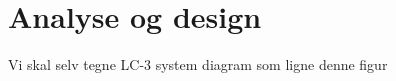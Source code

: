 \chapter{Analyse og design}\label{cha:analysedesign}

Vi skal selv tegne LC-3 system diagram som ligne denne figur

